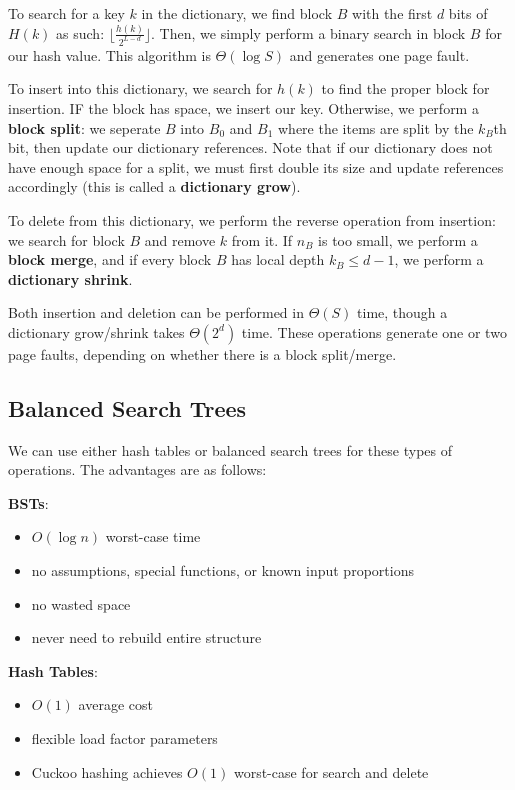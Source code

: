 \documentclass[12pt]{article}
\begin{document}
To search for a key $k$ in the dictionary, we find block $B$ with the first $d$ bits of $H(k)$ as such: $\lfloor \frac{h(k)}{2^{L-d}} \rfloor$. Then, we simply perform a binary search in block $B$ for our hash value. This algorithm is $\Theta(\log S)$ and generates one page fault.

To insert into this dictionary, we search for $h(k)$ to find the proper block for insertion. IF the block has space, we insert our key. Otherwise, we perform a {\bf block split}: we seperate $B$ into $B_0$ and $B_1$ where the items are split by the $k_B$th bit, then update our dictionary references. Note that if our dictionary does not have enough space for a split, we must first double its size and update references accordingly (this is called a {\bf dictionary grow}).

To delete from this dictionary, we perform the reverse operation from insertion: we search for block $B$ and remove $k$ from it. If $n_B$ is too small, we perform a {\bf block merge}, and if every block $B$ has local depth $k_B \leq d - 1$, we perform a {\bf dictionary shrink}.

Both insertion and deletion can be performed in $\Theta(S)$ time, though a dictionary grow/shrink takes $\Theta(2^d)$ time. These operations generate one or two page faults, depending on whether there is a block split/merge.

\subsection{Balanced Search Trees}
We can use either hash tables or balanced search trees for these types of operations. The advantages are as follows:

{\bf BSTs}:
\begin{itemize}
\item $O(\log n)$ worst-case time
\item no assumptions, special functions, or known input proportions
\item no wasted space
\item never need to rebuild entire structure
\end{itemize}

{\bf Hash Tables}:
\begin{itemize}
\item $O(1)$ average cost
\item flexible load factor parameters
\item Cuckoo hashing achieves $O(1)$ worst-case for search and delete
\end{itemize}
\end{document}
